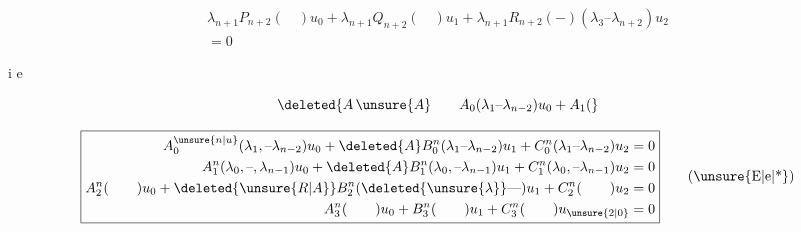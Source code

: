 {\scriptsize
\[
\boxed{\begin{aligned}
\lambda_{n+1}P_{n+2}(\quad)u_0+\lambda_{n+1}Q_{n+2}(\quad)u_1+
\lambda_{n+1}R_{n+2}(-)(\lambda_3\text{--}\lambda_{n+2})u_2\\
=0
\end{aligned}}\tag*{(3)}
\]
}

i e

\[
\deleted{A\,\unsure{A}\qquad A_0(\lambda_1\text{--}\lambda_{n-2})u_0+A_1(}
\]

{\scriptsize
\[
\boxed{\begin{aligned}
A_0^{\unsure{n|u}}(\lambda_1,\text{--}\lambda_{n-2})u_0+
\deleted{A}B_0^n(\lambda_1\text{--}\lambda_{n-2})u_1+C_0^n(\lambda_1\text{--}\lambda_{n-2})u_2&=0\\
A_1^n(\lambda_0,\text{--},\lambda_{n-1})u_0+
\deleted{A}B_1^n(\lambda_0,\text{--}\lambda_{n-1})u_1+
C_1^n(\lambda_0,\text{--}\lambda_{n-1})u_2&=0\\
A_2^n(\qquad)u_0+\deleted{\unsure{R|A}}B_2^n(\deleted{\unsure{\lambda}}\text{---})u_1+C_2^n(\qquad)u_2&=0\\
A_3^n(\qquad)u_0+B_3^n(\qquad)u_1+C_3^n(\qquad)u_{\unsure{2|0}}&=0
\end{aligned}}\tag*{(\unsure{E|e|*})}
\]
}

\endgroup

